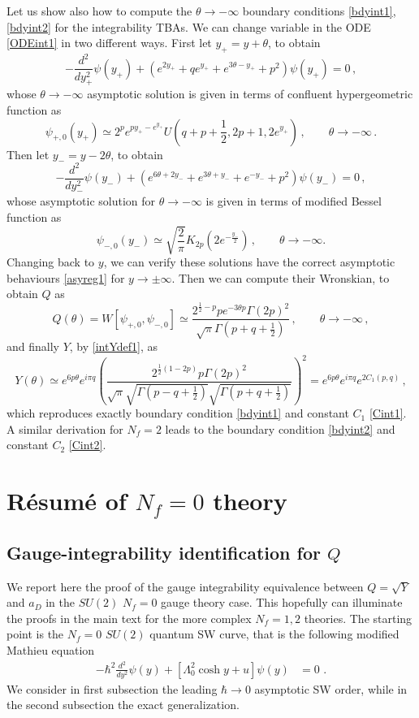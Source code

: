 \documentclass[11pt,a4paper]{elsarticle}
\newcommand{\be}{\begin{equation}}
\newcommand{\ee}{\end{equation}}
\numberwithin{figure}{section}
\numberwithin{table}{section}
\begin{document}
Let us show also how to compute the $\theta \to - \infty$ boundary conditions \eqref{bdyint1}, \eqref{bdyint2} for the  integrability TBAs. We can change variable in the ODE \eqref{ODEint1} in two different ways. First let $y_+ = y + \theta$, to obtain
\be
- \frac{d^2}{dy_+^2} \psi(y_+) + (e^{2 y_+} + q e^{y_+}+ e^{3 \theta -y_+} +p^2) \psi(y_+)=0\,,
\ee 
whose $\theta \to - \infty$ asymptotic solution is given in terms of confluent hypergeometric function as
\be
\psi_{+,0}(y_+)\simeq 2^p e^{p y_+ -e^{y_+}} U\left(q+p+\frac{1}{2},2 p+1,2 e^{y_+}\right)\,,\qquad \theta \to - \infty\,.
\ee
Then let $y_- = y -2\theta$, to obtain
\be
- \frac{d^2}{dy_-^2} \psi(y_-) + (e^{6 \theta +2 y_-}+ e^{3 \theta + y_-}+e^{- y_-} +p^2) \psi(y_-)=0\,,
\ee
whose asymptotic solution for $\theta \to - \infty$ is given in terms of modified Bessel function as
\be
\psi_{-,0}(y_-)\simeq \sqrt{\frac{2}{\pi }} K_{2 p}\left(2 e^{-\frac{y_-}{2}}\right)\,,\qquad \theta \to - \infty.
\ee
Changing back to $y$, we can verify these solutions have the correct asymptotic behaviours \eqref{asyreg1} for $y \to \pm \infty$. Then we can compute their Wronskian, to obtain $Q$ as
\be
Q(\theta)= W[\psi_{+,0},\psi_{-,0}]\simeq \frac{2^{\frac{1}{2}-p} p e^{-3 \theta  p} \Gamma (2 p)^2}{\sqrt{\pi } \Gamma \left(p+q+\frac{1}{2}\right)} \,, \qquad\theta \to - \infty\,,
\ee
and finally $Y$, by \eqref{intYdef1}, as
\be
Y(\theta) \simeq e^{6 p \theta} e^{i \pi q} \left(\frac{2^{\frac{1}{2} (1-2 p)} p \Gamma (2 p)^2}{\sqrt{\pi } \sqrt{\Gamma \left(p-q+\frac{1}{2}\right)} \sqrt{\Gamma \left(p+q+\frac{1}{2}\right)}}\right)^2 =e^{6 p \theta} e^{i \pi q} e^{2 C_1(p,q)}\,,
\ee
which reproduces exactly boundary condition \eqref{bdyint1} and constant $C_1$ \eqref{Cint1}. A similar derivation for $N_f=2$ leads to the boundary condition \eqref{bdyint2} and constant $C_2$ \eqref{Cint2}.

\section{R\'esum\'e of $N_f=0$ theory}

\subsection{Gauge-integrability identification for $Q$} \label{proofNf=0}\label{appProof}

We report here the proof of the gauge integrability equivalence between $Q = \sqrt{Y}$ and $a_D$ in the $SU(2)$ $N_f=0$ gauge theory case. This hopefully can illuminate the proofs in the main text for the more complex $N_f=1,2$ theories. The starting point is the $N_f=0$ $SU(2)$ quantum SW curve, that is the following modified Mathieu equation
\begin{align} \label{mMathieuSU2}
- \hbar^2   \frac{d^2}{dy^2} \psi(y) +[ \Lambda_0^2 \cosh{y} + u] \psi(y)&=0 \,\, .
\end{align}
We consider in first subsection the leading $\hbar \to 0$ asymptotic SW order, while in the second subsection the exact generalization. 
\end{document}
